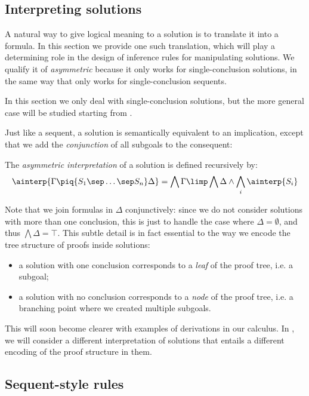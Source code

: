 \subsection{Interpreting solutions}

A natural way to give logical meaning to a solution is to translate it into a
formula. In this section we provide one such translation, which will play a
determining role in the design of inference rules for manipulating solutions. We
qualify it of \emph{asymmetric} because it only works for single-conclusion
solutions, in the same way that  only works for single-conclusion
sequents.

\begin{remark}
In this section we only deal with single-conclusion solutions, but the more
general case will be studied starting from .
\end{remark}

Just like a sequent, a solution is semantically equivalent to an implication,
except that we add the \emph{conjunction} of all subgoals to the consequent:

\begin{definition}
  The \emph{asymmetric interpretation} of a solution is defined recursively by:
  $$\ainterp{\Gamma \piq{S_1 \sep \ldots \sep S_n} \Delta} = \bigwedge \Gamma
    \limp \bigwedge \Delta \land \bigwedge_i{\ainterp{S_i}}$$
\end{definition}

Note that we join formulas in $\Delta$ conjunctively: since we do not consider
solutions with more than one conclusion, this is just to handle the case where
$\Delta = \emptyset$, and thus $\bigwedge \Delta = \top$. This subtle detail is
in fact essential to the way we encode the tree structure of proofs inside
solutions:
\begin{itemize}
  \item a solution with one conclusion corresponds to a \emph{leaf} of the proof
  tree, i.e. a subgoal;
  \item a solution with no conclusion corresponds to a \emph{node} of the proof
  tree, i.e. a branching point where we created multiple subgoals.
\end{itemize}
This will soon become clearer with examples of derivations in our calculus. In
, we will consider a different interpretation of
solutions that entails a different encoding of the proof structure in them.

\subsection{Sequent-style rules}

